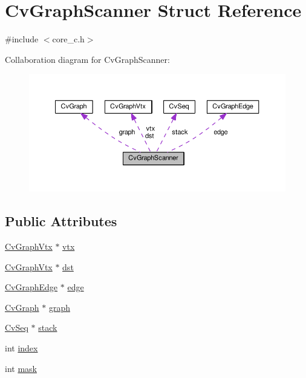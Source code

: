 \hypertarget{structCvGraphScanner}{\section{Cv\-Graph\-Scanner Struct Reference}
\label{structCvGraphScanner}
}


{\ttfamily \#include $<$core\-\_\-c.\-h$>$}



Collaboration diagram for Cv\-Graph\-Scanner\-:\nopagebreak
\begin{figure}[H]
\begin{center}
\leavevmode
\includegraphics[width=350pt]{structCvGraphScanner__coll__graph}
\end{center}
\end{figure}
\subsection*{Public Attributes}
\begin{DoxyCompactItemize}
\item 
\hyperlink{structCvGraphVtx}{Cv\-Graph\-Vtx} $\ast$ \hyperlink{structCvGraphScanner_ad80ad454de5201cefa11d83bc533f798}{vtx}
\item 
\hyperlink{structCvGraphVtx}{Cv\-Graph\-Vtx} $\ast$ \hyperlink{structCvGraphScanner_a91bef0ef47bc1f5639bcdf78249633d9}{dst}
\item 
\hyperlink{structCvGraphEdge}{Cv\-Graph\-Edge} $\ast$ \hyperlink{structCvGraphScanner_ab1dda30fae2447a8302717d1ba59cf39}{edge}
\item 
\hyperlink{structCvGraph}{Cv\-Graph} $\ast$ \hyperlink{structCvGraphScanner_a092119864e858db9dbb77816ded7e436}{graph}
\item 
\hyperlink{structCvSeq}{Cv\-Seq} $\ast$ \hyperlink{structCvGraphScanner_ab48c73ca35401a92cbcf479277642bc6}{stack}
\item 
int \hyperlink{structCvGraphScanner_a8942c65f190ecb15983491145c3d01ea}{index}
\item 
int \hyperlink{structCvGraphScanner_a95d8158067ea2c81be54de5ca67cb67d}{mask}
\end{DoxyCompactItemize}


